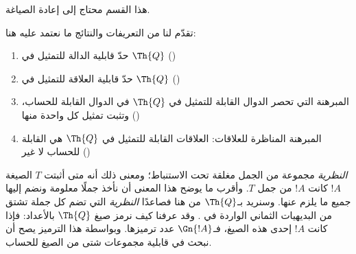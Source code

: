 \documentclass[../../../include/open-logic-section]{subfiles}
\begin{document}


\begin{editorial}
هذا القسم محتاج إلى إعادة الصياغة.
\end{editorial}

تقدّم لنا من التعريفات والنتائج ما نعتمد عليه هنا:
\begin{enumerate}
\item حدّ قابلية الدالة للتمثيل في $\Th{Q}$
  ()
\item حدّ قابلية العلاقة للتمثيل في $\Th{Q}$
  ()
\item المبرهنة التي تحصر الدوال القابلة للتمثيل في $\Th{Q}$ في الدوال
  القابلة للحساب، وتثبت تمثيل كل واحدة منها
  ()
\item المبرهنة المناظرة للعلاقات: العلاقات القابلة للتمثيل في $\Th{Q}$
  هي القابلة للحساب لا غير
  ()
\end{enumerate}

{ \em النظرية} مجموعة من الجمل مغلقة تحت الاستنباط؛ ومعنى ذلك أنه
متى أثبتت $T$ الصيغة $!A$ كانت $!A$ من جمل $T$. وأقرب ما يوضح هذا
المعنى أن نأخذ جملًا معلومة ونضم إليها جميع ما يلزم عنها. وسنريد
بـ$\Th{Q}$ من هنا فصاعدًا { \em النظرية} التي تضم كل جملة تشتق من
البديهيات الثماني الواردة في . وقد عرفنا كيف
نرمز صيغ $\Th{Q}$ بالأعداد: فإذا كانت $!A$ إحدى هذه الصيغ، فـ$\Gn{!A}$
عدد ترميزها. وبواسطة هذا الترميز يصح أن نبحث في قابلية مجموعات شتى
من الصيغ للحساب.
\end{document}
